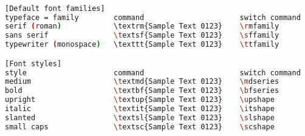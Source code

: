 \documentclass{article}
\begin{document}
\begin{lstlisting}[language=bash, caption=example]

[Default font families]
typeface = family        command                      switch command
serif (roman)            \textrm{Sample Text 0123}    \rmfamily
sans serif               \textsf{Sample Text 0123}    \sffamily
typewriter (monospace)   \texttt{Sample Text 0123}    \ttfamily

[Font styles]
style                    command                      switch command
medium                   \textmd{Sample Text 0123}    \mdseries
bold                     \textbf{Sample Text 0123}    \bfseries
upright                  \textup{Sample Text 0123}    \upshape
italic                   \textit{Sample Text 0123}    \itshape
slanted                  \textsl{Sample Text 0123}    \slshape
small caps               \textsc{Sample Text 0123}    \scshape

\end{lstlisting}
\end{document}

